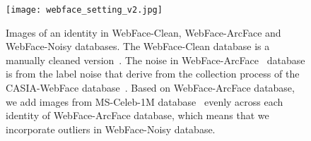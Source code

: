 \documentclass[journal,comsoc]{IEEEtran}
\begin{document}
  
\begin{figure}[htbp]
	\center
	\texttt{[image: webface\_setting\_v2.jpg]}
	\caption{Images of an identity in WebFace-Clean, WebFace-ArcFace and WebFace-Noisy databases. The WebFace-Clean database is a manually cleaned version~\cite{rwebface_wang,deng2019arcface}. The noise in WebFace-ArcFace~\cite{deng2019arcface} database is from the label noise that derive from the collection process of the CASIA-WebFace database~\cite{Yi2014CASIA}. Based on WebFace-ArcFace database, we add images from MS-Celeb-1M database~\cite{guo2016msceleb} evenly across each identity of WebFace-ArcFace database, which means that we incorporate outliers in WebFace-Noisy database.}
	\label{fig:web-noise}
\end{figure}

\begin{table}[htbp]
	\renewcommand\arraystretch{1.05}
	\begin{center}
		\caption{Study on the choice of hype-parameters $a$ and $b$ of SFace (ResNet34). As the noise level increases, parameter $a$ should be larger, \emph{i.e}. ${v_{intra}}\left( {{\theta _{{y_i}}}} \right)$ curves should move to the right, which indicates that the speed of intra-class is decreased more early to prevent overfitting.}
		\label{table:parameters}
\end{center}
\end{table}
\end{document}
